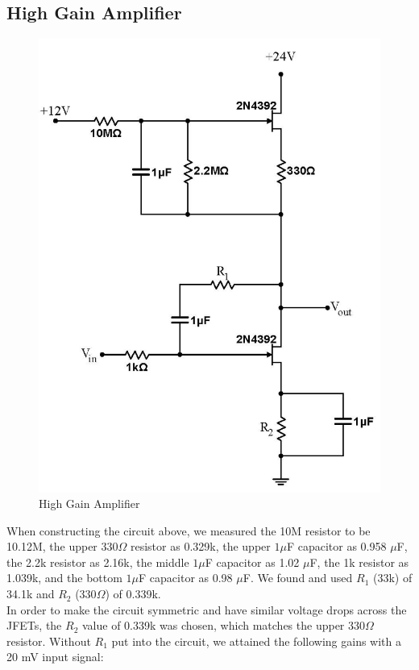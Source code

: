 \documentclass{article}
\begin{document}
\subsection{High Gain Amplifier}
    \begin{figure}[H]
        \centering
        \includegraphics[scale = 0.6]{5_13.png}
        \caption{High Gain Amplifier~\cite{webfig}}
        \label{fig:my_label}
    \end{figure}
    When constructing the circuit above, we measured the 10M resistor to be 10.12M, the upper 330$\Omega$ resistor as 0.329k, the upper $1 \mu$F capacitor as 0.958 $\mu$F, the 2.2k resistor as 2.16k, the middle $1 \mu$F capacitor as 1.02 $\mu$F, the 1k resistor as 1.039k, and the bottom $1 \mu$F capacitor as 0.98 $\mu$F. We found and used $R_1$ (33k) of 34.1k and $R_2$ (330$\Omega$) of 0.339k. \\\indent
    In order to make the circuit symmetric and have similar voltage drops across the JFETs, the $R_2$ value of 0.339k was chosen, which matches the upper 330$\Omega$ resistor. Without $R_1$ put into the circuit, we attained the following gains with a 20 mV input signal:
\end{document}
